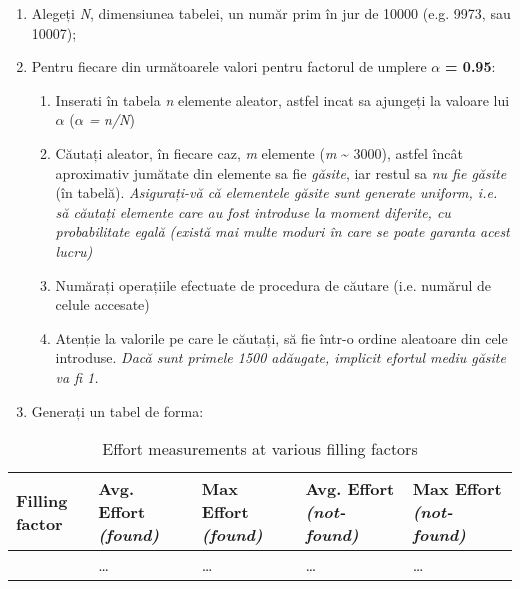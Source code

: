 \documentclass[../ro-fa-lab.tex]{subfiles}
\begin{document}
\begin{enumerate}
\def\labelenumi{\arabic{enumi}.}
\item
  Alegeți \emph{N}, dimensiunea tabelei, un număr prim în jur de 10000
  (e.g. 9973, sau 10007);
\item
  Pentru fiecare din următoarele valori pentru factorul de umplere
  \textbf{$\alpha$} \textbf{= 0.95}:

  \begin{enumerate}
  \def\labelenumii{\alph{enumii}.}
  \item
    Inserati în tabela \emph{n} elemente aleator, astfel incat sa
    ajungeți la valoare lui \emph{$\alpha$} (\emph{$\alpha$ =} \emph{n/N})
  \item
    Căutați aleator, în fiecare caz, \emph{m} elemente (\emph{m}
    \textasciitilde{} 3000), astfel încât aproximativ jumătate din
    elemente sa fie \emph{găsite}, iar restul sa \emph{nu fie găsite}
    (în tabelă). \emph{Asigurați-vă că elementele găsite sunt generate
    uniform, i.e. să căutați elemente care au fost introduse la moment
    diferite, cu probabilitate egală (există mai multe moduri în care se
    poate garanta acest lucru)}
  \item
    Numărați operațiile efectuate de procedura de căutare (i.e. numărul
    de celule accesate)
  \item
    Atenție la valorile pe care le căutați, să fie într-o ordine
    aleatoare din cele introduse. \emph{Dacă sunt primele 1500 adăugate,
    implicit efortul mediu găsite va fi 1.}
  \end{enumerate}
\item
  Generați un tabel de forma:
\end{enumerate}

\begin{table}[ht]
  \centering
  \caption{Effort measurements at various filling factors}
  \label{tbl:effort-vs-filling}
  \begin{tabularx}{\textwidth}{%
      >{\centering\arraybackslash}X
      >{\centering\arraybackslash}X
      >{\centering\arraybackslash}X
      >{\centering\arraybackslash}X
      >{\centering\arraybackslash}X
    }
    \toprule
    \textbf{Filling factor}
      & \textbf{Avg. Effort \emph{(found)}}
      & \textbf{Max Effort \emph{(found)}}
      & \textbf{Avg. Effort \emph{(not-found)}}
      & \textbf{Max Effort \emph{(not-found)}} \\
    \midrule
    0.95 & … & … & … & … \\
    \bottomrule
  \end{tabularx}
\end{table}
\end{document}
